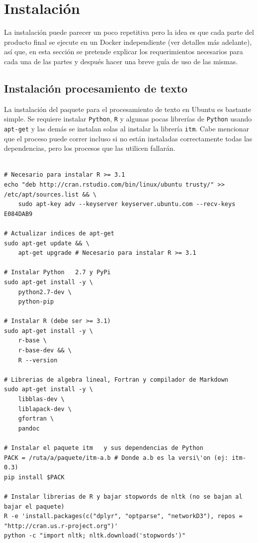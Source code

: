 \chapter{Instalación}
\label{ch:guia}


La instalación puede parecer un poco repetitiva pero la idea es que cada parte del producto final se ejecute en un Docker independiente (ver detalles más adelante), así que, en esta sección se pretende explicar los requerimientos necesarios para cada una de las partes y después hacer una breve guía de uso de las mismas.

\section{Instalación procesamiento de texto}

La instalación del paquete para el procesamiento de texto en Ubuntu es bastante simple. Se requiere instalar \texttt{Python}, \texttt{R} y algunas pocas librerías de \texttt{Python} usando \texttt{apt-get} y las demás se instalan solas al instalar la librería \texttt{itm}. Cabe mencionar que el proceso puede correr incluso si no están instaladas correctamente todas las dependencias, pero los procesos que las utilicen fallarán.

\begin{lstlisting}
 
# Necesario para instalar R >= 3.1
echo "deb http://cran.rstudio.com/bin/linux/ubuntu trusty/" >> /etc/apt/sources.list && \
	sudo apt-key adv --keyserver keyserver.ubuntu.com --recv-keys E084DAB9

# Actualizar indices de apt-get
sudo apt-get update && \
	apt-get upgrade # Necesario para instalar R >= 3.1

# Instalar Python	2.7 y PyPi
sudo apt-get install -y \
	python2.7-dev \
	python-pip

# Instalar R (debe ser >= 3.1)
sudo apt-get install -y \
	r-base \
	r-base-dev && \
	R --version

# Librerias de algebra lineal, Fortran y compilador de Markdown
sudo apt-get install -y \
	libblas-dev \
	liblapack-dev \
	gfortran \
	pandoc

# Instalar el paquete itm	y sus dependencias de Python
PACK = /ruta/a/paquete/itm-a.b # Donde a.b es la versi\'on (ej: itm-0.3)
pip install $PACK

# Instalar librerias de R y bajar stopwords de nltk (no se bajan al bajar el paquete)
R -e 'install.packages(c("dplyr", "optparse", "networkD3"), repos = "http://cran.us.r-project.org")'
python -c "import nltk; nltk.download('stopwords')"
\end{lstlisting}


